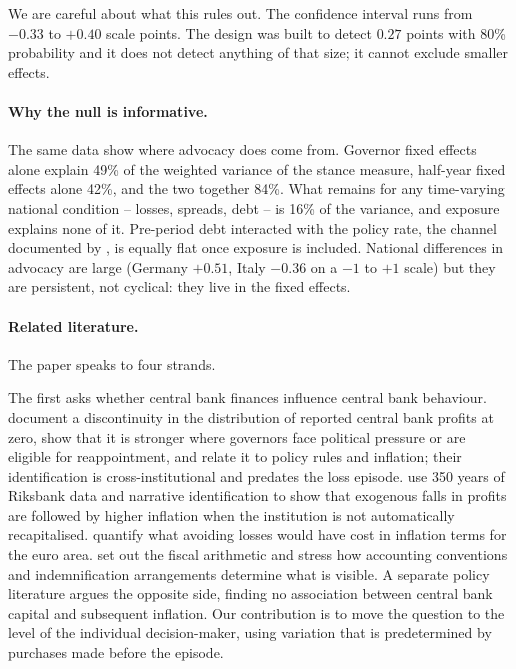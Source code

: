 \documentclass[11pt]{article}
\theoremstyle{plain}
\begin{document}
We are careful about what this rules out. The confidence interval runs from $-0.33$ to $+0.40$ scale points. The design was built to detect $0.27$ points with 80\% probability and it does not detect anything of that size; it cannot exclude smaller effects.

\paragraph{Why the null is informative.} The same data show where advocacy does come from. Governor fixed effects alone explain 49\% of the weighted variance of the stance measure, half-year fixed effects alone 42\%, and the two together 84\%. What remains for any time-varying national condition -- losses, spreads, debt -- is 16\% of the variance, and exposure explains none of it. Pre-period debt interacted with the policy rate, the channel documented by \citet{heinemann2026}, is equally flat once exposure is included. National differences in advocacy are large (Germany $+0.51$, Italy $-0.36$ on a $-1$ to $+1$ scale) but they are persistent, not cyclical: they live in the fixed effects.

\paragraph{Related literature.}
The paper speaks to four strands.

The first asks whether central bank finances influence central bank behaviour. \citet{goncharov2023} document a discontinuity in the distribution of reported central bank profits at zero, show that it is stronger where governors face political pressure or are eligible for reappointment, and relate it to policy rules and inflation; their identification is cross-institutional and predates the loss episode. \citet{grodecka2025} use 350 years of Riksbank data and narrative identification to show that exogenous falls in profits are followed by higher inflation when the institution is not automatically recapitalised. \citet{gebauer2024} quantify what avoiding losses would have cost in inflation terms for the euro area. \citet{cecchetti2024} set out the fiscal arithmetic and stress how accounting conventions and indemnification arrangements determine what is visible. A separate policy literature argues the opposite side, finding no association between central bank capital and subsequent inflation. Our contribution is to move the question to the level of the individual decision-maker, using variation that is predetermined by purchases made before the episode.
\end{document}

